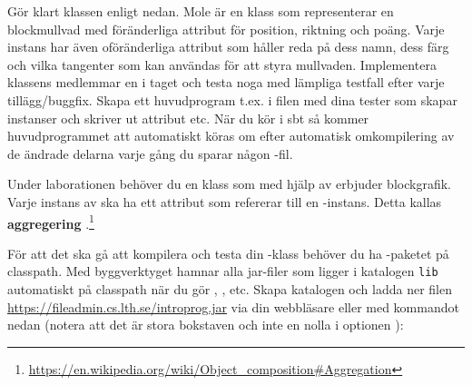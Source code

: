 \Subtask Gör klart klassen  enligt nedan. Mole är en klass som representerar en blockmullvad med föränderliga attribut för position, riktning och poäng. Varje instans har även oföränderliga attribut som håller reda på dess namn, dess färg och vilka tangenter som kan användas för att styra mullvaden. Implementera klassens medlemmar en i taget och testa noga med lämpliga testfall efter varje tillägg/buggfix. Skapa ett huvudprogram t.ex. i filen  med dina tester som skapar instanser och skriver ut attribut etc. När du kör  i sbt så kommer huvudprogrammet att automatiskt köras om efter automatisk omkompilering av de ändrade delarna varje gång du sparar någon -fil.
%
%
%
%
%



\Subtask Under laborationen behöver du en klass  som med hjälp av  erbjuder blockgrafik. Varje instans av  ska ha ett attribut som refererar till en -instans. Detta kallas \textbf{aggregering} .\footnote{\url{https://en.wikipedia.org/wiki/Object\_composition\#Aggregation}}

För att det ska gå att kompilera och testa din -klass behöver du ha -paketet på classpath. Med byggverktyget  hamnar alla jar-filer som ligger i katalogen \texttt{lib} automatiskt på classpath när du gör , , etc. Skapa katalogen  och ladda ner filen \url{https://fileadmin.cs.lth.se/introprog.jar} via din webbläsare eller med kommandot  nedan (notera att det är stora bokstaven  och inte en nolla i optionen ):

